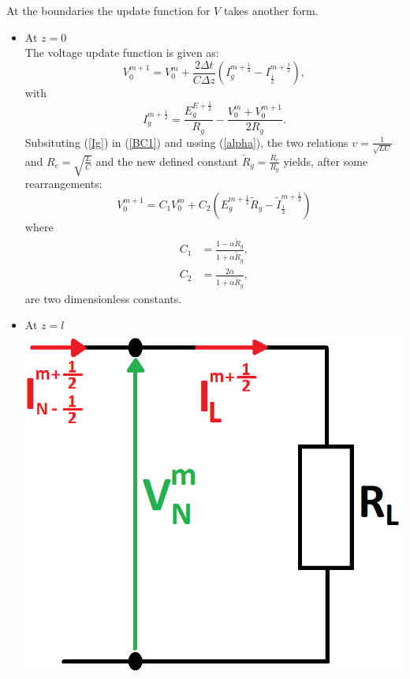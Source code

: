 \documentclass[dutch, a4paper, 11pt]{article}
\begin{document}
\begin{multicols}{2}
At the boundaries the update function for $V$ takes another form.
\begin{itemize}
    \item At $z = 0$\\
    The voltage update function is given as:
    \begin{equation}
        V^{m+1}_{0} = V^{m}_{0} + \frac{2\Delta t}{C\Delta z}\left(I^{m+\frac{1}{2}}_{g} - I^{m+\frac{1}{2}}_{\frac{1}{2}}\right),
        \label{BC1}
    \end{equation}
    with 
    \begin{equation}
        I^{m+\frac{1}{2}}_{g} = \frac{E^{E+\frac{1}{2}}_{g}}{R_{g}}-\frac{V^{m}_{0}+V^{m+1}_{0}}{2R_g}.
        \label{Ig}
    \end{equation}
    Subsituting (\ref{Ig}) in (\ref{BC1}) and ussing (\ref{alpha}), the two relations $v=\frac{1}{\sqrt{LC}}$ and $R_c=\sqrt{\frac{L}{C}}$ and the new defined constant $\tilde{R}_{g} = \frac{R_c}{R_g}$ yields, 
    after some rearrangements:
    \begin{equation}
        V^{m+1}_{0} = C_{1}V^{m}_{0} + C_{2}\left(E^{m+\frac{1}{2}}_{g}\tilde{R}_{g} - \tilde{I}^{m+\frac{1}{2}}_{\frac{1}{2}}\right)
    \end{equation}
    where
    \begin{align}
        C_{1} & = \frac{1-\alpha\tilde{R}_{g}}{1+\alpha\tilde{R}_{g}},\\
        C_{2} & = \frac{2\alpha}{1+\alpha\tilde{R}_{g}},
    \end{align}
    are two dimensionless constants.
    \item At $z = l$\\
    \includegraphics[scale=0.25]{BC2}


\end{itemize}
\end{multicols}
\end{document}
